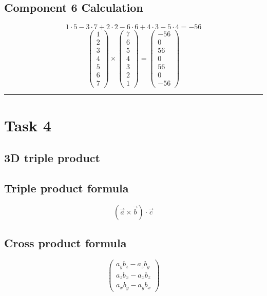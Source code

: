 \documentclass{article}
\begin{document}
\subsection*{ \vspace{1em} Component 6 Calculation}
\[
1 \cdot 5 - 3 \cdot 7 + 2 \cdot 2 - 6 \cdot 6 + 4 \cdot 3 - 5 \cdot 4 = -56
\]
\[
\begin{pmatrix}1 \\ 2 \\ 3 \\ 4 \\ 5 \\ 6 \\ 7\end{pmatrix} \times \begin{pmatrix}7 \\ 6 \\ 5 \\ 4 \\ 3 \\ 2 \\ 1\end{pmatrix} = \begin{pmatrix}-56 \\ 0 \\ 56 \\ 0 \\ 56 \\ 0 \\ -56\end{pmatrix}
\]
\vspace{1em}
\hrule
\vspace{1em}
\section*{Task 4}

\subsection*{3D triple product}
\subsection*{ \vspace{1em} Triple product formula}
\[
(\vec{a} \times \vec{b}) \cdot \vec{c}
\]
\subsection*{ \vspace{1em} Cross product formula}
\[
\begin{pmatrix}
a_y b_z - a_z b_y \\ 
a_z b_x - a_x b_z \\ 
a_x b_y - a_y b_x
\end{pmatrix}
\]
\end{document}
